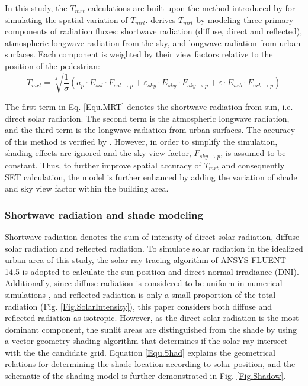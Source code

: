 \documentclass[smallextended]{svjour3}
\begin{document}
In this study, the $T_{mrt}$ calculations are built upon the method introduced by \citet{huang2014citycomfort+} for simulating the spatial variation of $T_{mrt}$.  \citet{huang2014citycomfort+} derives $T_{mrt}$ by modeling three primary components of radiation fluxes: shortwave radiation (diffuse, direct and reflected), atmospheric longwave radiation from the sky, and longwave radiation from urban surfaces. Each component is weighted by their view factors relative to the position of the pedestrian:\\
\begin{equation}
T_{mrt}=\sqrt[4]{\frac{1}{\sigma}(a_{p}{\cdot}E_{sol}{\cdot}F_{sol\rightarrow{p}}+\varepsilon_{sky}{\cdot}E_{sky}{\cdot}F_{sky\rightarrow{p}}+\varepsilon{\cdot}E_{urb}{\cdot}F_{urb\rightarrow{p}})}
\label{Equ.MRT}
\end{equation}

The first term in Eq. \ref{Equ.MRT} denotes the shortwave radiation from sun, i.e. direct solar radiation. The second term is the atmospheric longwave radiation, and the third term is the longwave radiation from urban surfaces. The accuracy of this method is verified by \citet{huang2014citycomfort+}. However, in order to simplify the simulation, shading effects are ignored and the sky view factor, $F_{sky\rightarrow{p}}$, is assumed to be constant. Thus, to further improve spatial accuracy of $T_{mrt}$ and consequently SET calculation, the model is further enhanced by adding the variation of shade and sky view factor within the building area.

\subsubsection{Shortwave radiation and shade modeling}
Shortwave radiation denotes the sum of intensity of direct solar radiation, diffuse solar radiation and reflected radiation. To simulate solar radiation in the idealized urban area of this study, the solar ray-tracing algorithm of ANSYS FLUENT 14.5 is adopted to calculate the sun position and direct normal irradiance (DNI). Additionally, since diffuse radiation is considered to be uniform in numerical simulations \cite{flint1998solar, sreekumar1998egret, madronich1999role}, and reflected radiation is only a small proportion of the total radiation (Fig. \ref{Fig.SolarIntensity}), this paper considers both diffuse and reflected radiation as isotropic. However, as the direct solar radiation is the most dominant component, the sunlit areas are distinguished from the shade by using a vector-geometry shading algorithm that determines if the solar ray intersect with the the candidate grid. Equation \ref{Equ.Shad} explains the geometrical relations for determining the shade location according to solar position, and the schematic of the shading model is further demonstrated in Fig. \ref{Fig.Shadow}. 
\end{document}
